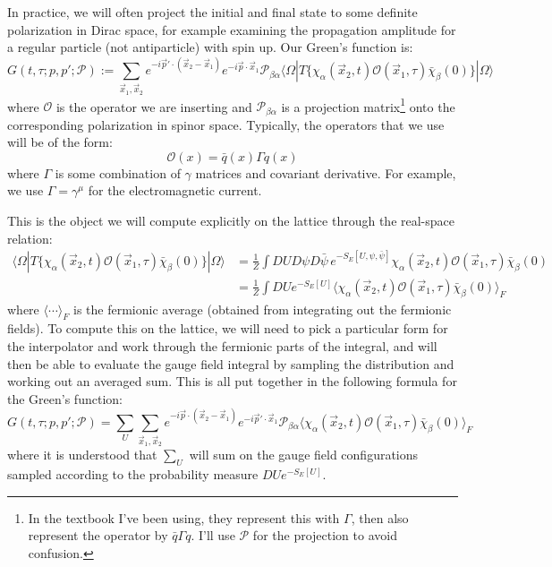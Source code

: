 \documentclass[11pt, oneside]{article}   	%
\theoremstyle{definition}
\begin{document}
In practice, we will often project the initial and final state to some definite polarization in Dirac space, for example examining  
the propagation amplitude for a regular particle (not antiparticle) with spin up. Our Green's function is:
\begin{equation}
	G(t, \tau; p, p'; \mathcal P) := \sum_{\vec x_1, \vec x_2} e^{-i\vec p'\cdot (\vec x_2 - \vec x_1)}
	e^{-i\vec p\cdot\vec x_1}\mathcal P_{\beta\alpha}\langle\Omega | T\{\chi_\alpha(\vec x_2, t)\mathcal O (\vec x_1, \tau)
	\bar\chi_\beta(0)\}| \Omega\rangle
\end{equation}
where $\mathcal O$ is the operator we are inserting and $\mathcal P_{\beta\alpha}$ is a projection matrix\footnote{In the 
textbook I've been using, they represent this with $\Gamma$, then also represent the operator by $\bar q\Gamma q$. I'll use 
$\mathcal P$ for the projection to avoid confusion.} onto the corresponding polarization in 
spinor space. Typically, the operators that we use will be of the form:
\begin{equation}
	\mathcal O(x) = \bar q(x) \Gamma q(x)
\end{equation}
where $\Gamma$ is some combination of $\gamma$ matrices and covariant derivative. For example, we use $\Gamma = 
\gamma^\mu$ for the electromagnetic current. 

This is the object we will compute explicitly on the lattice through the real-space relation:
\begin{align}
	\langle\Omega | T\{\chi_\alpha(\vec x_2, t)\mathcal O(\vec x_1, \tau)\bar\chi_\beta(0)\} |\Omega\rangle &= \frac{1}{Z}\int 
	DU D\psi D\bar\psi\,e^{-S_E[U, \psi, \bar\psi]}\chi_\alpha(\vec x_2, t)\mathcal O(\vec x_1, \tau)\bar\chi_\beta(0) \\
	&= \frac{1}{Z}\int DU e^{-S_E[U]} \langle\chi_\alpha(\vec x_2, t)\mathcal O(\vec x_1, \tau)\bar\chi_\beta(0)\rangle_F
\end{align}
where $\langle\cdots\rangle_F$ is the fermionic average (obtained from integrating out the fermionic fields). 
To compute this on the lattice, we will need to pick a particular form for the interpolator and work through the fermionic parts of the integral, and 
will then be able to evaluate the gauge field integral by sampling the distribution and working out an averaged sum. This is all put together in the 
following formula for the Green's function:
\begin{equation}
	G(t, \tau; p, p'; \mathcal P) = \sum_U\sum_{\vec x_1, \vec x_2} e^{-i\vec p\cdot (\vec x_2 - \vec x_1)} e^{-i\vec p'\cdot\vec 
	x_1}\mathcal P_{\beta\alpha}\langle\chi_\alpha(\vec x_2, t)\mathcal O(\vec x_1, \tau)\bar\chi_\beta(0)\rangle_F~
	\label{eq:greens_fn_reduced}
\end{equation}
where it is understood that $\sum_U$ will sum on the gauge field configurations sampled according to the probability measure $DU e^{-S_E[U]}$. 
\end{document}
